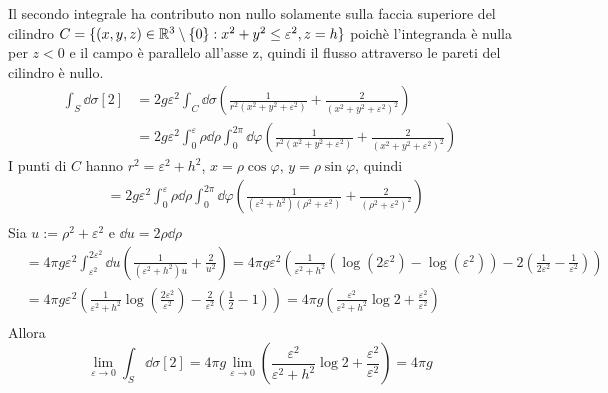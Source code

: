 Il secondo integrale ha contributo non nullo solamente sulla faccia superiore del cilindro
$C = \{ (x,y,z) \in \mathbb{R}^3 \setminus \{0\} : x^2 + y^2 \leq \varepsilon^2, z = h \}$
poichè l'integranda è nulla per $z<0$ e il campo è parallelo all'asse z, quindi il flusso
attraverso le pareti del cilindro è nullo.
\begin{equation*}
   \begin{split}
       \int_S \dd \sigma [2] &= 2g\varepsilon^2 \int_C \dd \sigma
             \left( \frac{1}{r^2(x^2 + y^2 + \varepsilon^2)}
                + \frac{2}{(x^2 + y^2 + \varepsilon^2)^2} \right) \\
       &= 2g\varepsilon^2 \int_0^\varepsilon\rho\dd \rho \int_0^{2\pi} \dd \varphi
       \left( \frac{1}{r^2(x^2 + y^2 + \varepsilon^2)}
           + \frac{2}{(x^2 + y^2 + \varepsilon^2)^2}\right)
   \end{split}
\end{equation*}
I punti di $C$ hanno $r^2 = \varepsilon^2 + h^2$, $x = \rho \cos\varphi$, $y = \rho \sin\varphi$, quindi
\begin{equation*}
   \begin{split}
      &= 2g\varepsilon^2 \int_0^\varepsilon\rho\dd \rho \int_0^{2\pi} \dd \varphi
      \left( \frac{1}{(\varepsilon^2 + h^2)(\rho^2 + \varepsilon^2)}
          + \frac{2}{(\rho^2 + \varepsilon^2)^2} \right) \\
   \end{split}
\end{equation*}
Sia $u := \rho^2 + \varepsilon^2$ e $\dd u = 2\rho \dd \rho$
\begin{equation*}
   \begin{split}
      &= 4\pi g\varepsilon^2 \int_{\varepsilon^2}^{2\varepsilon^2} \dd u
         \left( \frac{1}{(\varepsilon^2 + h^2)u} + \frac{2}{u^2} \right)
      = 4\pi g\varepsilon^2
         \left( \frac{1}{\varepsilon^2 + h^2}( \log(2\varepsilon^2)-\log(\varepsilon^2) )
            - 2\left( \frac{1}{2\varepsilon^2} - \frac{1}{\varepsilon^2} \right) \right) \\
      &= 4\pi g\varepsilon^2
         \left( \frac{1}{\varepsilon^2 + h^2} \log\left( \frac{2\varepsilon^2}{\varepsilon^2}\right)
            - \frac{2}{\varepsilon^2}\left( \frac{1}{2} - 1 \right) \right)
      = 4\pi g
         \left( \frac{\varepsilon^2}{\varepsilon^2 + h^2} \log 2
            + \frac{\varepsilon^2}{\varepsilon^2} \right) \\
   \end{split}
\end{equation*}
Allora
$$
   \lim_{\varepsilon \to 0} \int_S \dd \sigma [2] = 4\pi g
      \lim_{\varepsilon \to 0} \left( \frac{\varepsilon^2}{\varepsilon^2 + h^2} \log 2
         + \frac{\varepsilon^2}{\varepsilon^2} \right) = 4\pi g
$$

